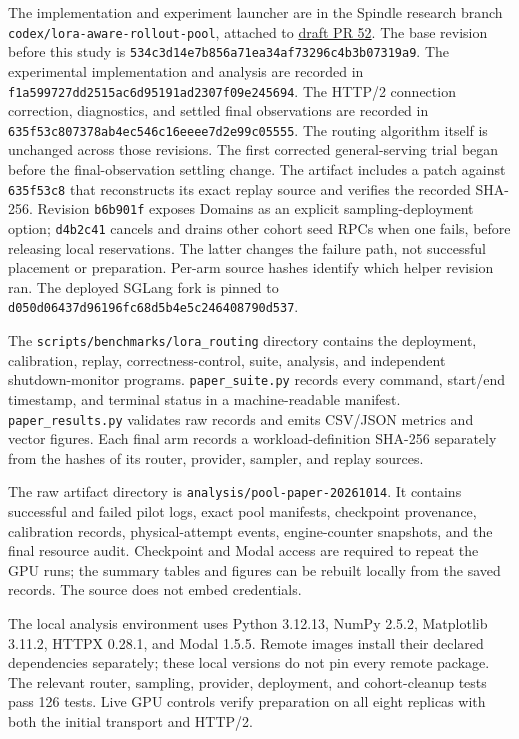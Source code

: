 
The implementation and experiment launcher are in the Spindle research branch
\texttt{codex/lora-aware-rollout-pool}, attached to
\href{https://github.com/modal-projects/spindle/pull/52}{draft PR 52}.
The base revision before this study is
\texttt{534c3d14e7b856a71ea34af73296c4b3b07319a9}.
The experimental implementation and analysis are recorded in
\texttt{f1a599727dd2515ac6d95191ad2307f09e245694}.
The HTTP/2 connection correction, diagnostics, and settled final observations
are recorded in \texttt{635f53c807378ab4ec546c16eeee7d2e99c05555}.
The routing algorithm itself is unchanged across those revisions.
The first corrected general-serving trial began before the final-observation
settling change. The artifact includes a patch against \texttt{635f53c8} that
reconstructs its exact replay source and verifies the recorded SHA-256.
Revision \texttt{b6b901f} exposes Domains as an explicit sampling-deployment
option; \texttt{d4b2c41} cancels and drains other cohort seed RPCs when one fails,
before releasing local reservations. The latter changes the failure path, not
successful placement or preparation. Per-arm source hashes identify which
helper revision ran.
The deployed SGLang fork is pinned to
\texttt{d050d06437d96196fc68d5b4e5c246408790d537}.

The \texttt{scripts/benchmarks/lora\_routing} directory contains the deployment,
calibration, replay, correctness-control, suite, analysis, and independent
shutdown-monitor programs. \texttt{paper\_suite.py} records every command,
start/end timestamp, and terminal status in a machine-readable manifest.
\texttt{paper\_results.py} validates raw records and emits CSV/JSON metrics and
vector figures. Each final arm records a workload-definition SHA-256 separately
from the hashes of its router, provider, sampler, and replay sources.

The raw artifact directory is \texttt{analysis/pool-paper-20261014}. It contains
successful and failed pilot logs, exact pool manifests, checkpoint provenance,
calibration records, physical-attempt events, engine-counter snapshots, and the
final resource audit. Checkpoint and Modal access are required to repeat the GPU
runs; the summary tables and figures can be rebuilt locally from the saved
records. The source does not embed credentials.

The local analysis environment uses Python 3.12.13, NumPy 2.5.2, Matplotlib
3.11.2, HTTPX 0.28.1, and Modal 1.5.5. Remote images install their declared
dependencies separately; these local versions do not pin every remote package.
The relevant router, sampling, provider, deployment, and cohort-cleanup tests pass
126 tests. Live GPU controls verify preparation on all eight replicas with both
the initial transport and HTTP/2.

